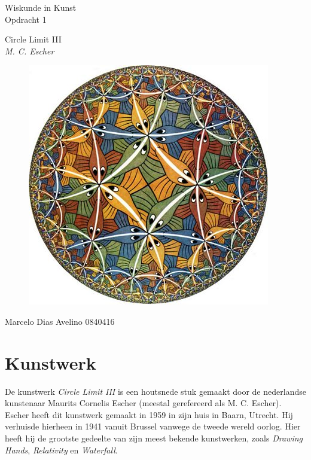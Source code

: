\documentclass{article}
\begin{document}
\begin{center}
	\huge{Wiskunde in Kunst}\\
	\LARGE{Opdracht 1} \\
	
	\vspace{2cm}
	
	\Large{Circle Limit III}\\
	\large{\textit{M. C. Escher}}
	
	\begin{figure}[htp]
		\centering
		\includegraphics[scale=1.00]{Escher_Circle_Limit_III.jpg}
		\label{}
	\end{figure}
	
	\vfill
	\Large{Marcelo Dias Avelino} \hfill \large{0840416}
\end{center}

\pagebreak

\section{Kunstwerk}

De kunstwerk \textit{Circle Limit III} is een houtsnede stuk gemaakt door de nederlandse kunstenaar Maurits Cornelis Escher (meestal gerefereerd als M. C. Escher). Escher heeft dit kunstwerk gemaakt in 1959 in zijn huis in Baarn, Utrecht. Hij verhuisde hierheen in 1941 vanuit Brussel vanwege de tweede wereld oorlog. Hier heeft hij de grootste gedeelte van zijn meest bekende kunstwerken, zoals \textit{Drawing Hands}, \textit{Relativity} en \textit{Waterfall}.
\end{document}
